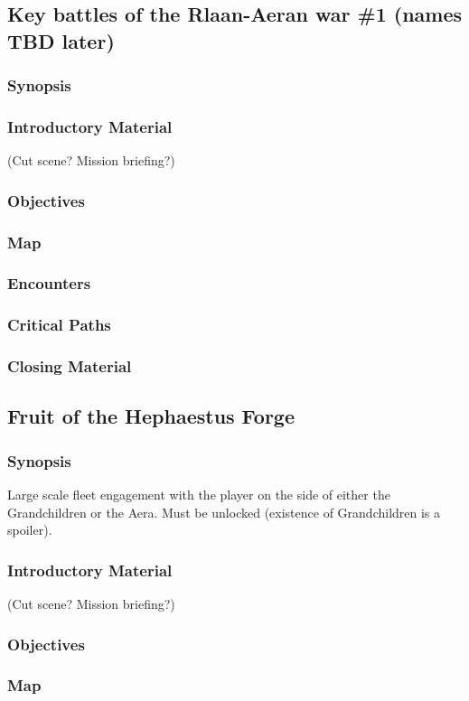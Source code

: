 \subsection{Key battles of the Rlaan-Aeran war \#1 (names TBD later)}
\subsubsection{Synopsis}
\subsubsection{Introductory Material}
 (Cut scene?  Mission briefing?)
\subsubsection{Objectives}
\subsubsection{Map}
\subsubsection{Encounters}
\subsubsection{Critical Paths}
\subsubsection{Closing Material}

\subsection{Fruit of the Hephaestus Forge}
\subsubsection{Synopsis}
Large scale fleet engagement with the player on the side of either the Grandchildren or the Aera.
Must be unlocked (existence of Grandchildren is a spoiler).
\subsubsection{Introductory Material}
 (Cut scene?  Mission briefing?)
\subsubsection{Objectives}
\subsubsection{Map}
